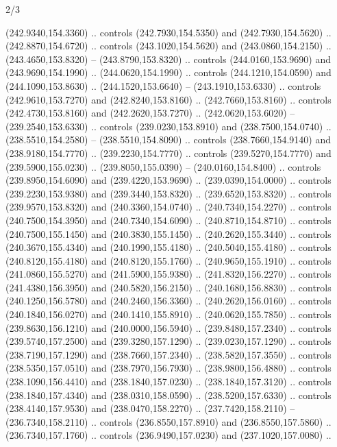 \begin{flagdescription}{2/3}
\begin{scope}[xshift=0.5\flaglength,yshift=0.5\flagwidth,scale=\flagwidth/259.2]
\begin{scope}[y=0.8pt, x=0.8pt, yscale=-1,shift={(-243,-162)}]
      (242.9340,154.3360) .. controls (242.7930,154.5350) and (242.7930,154.5620) ..
      (242.8870,154.6720) .. controls (243.1020,154.5620) and (243.0860,154.2150) ..
      (243.4650,153.8320) -- (243.8790,153.8320) .. controls (244.0160,153.9690) and
      (243.9690,154.1990) .. (244.0620,154.1990) .. controls (244.1210,154.0590) and
      (244.1090,153.8630) .. (244.1520,153.6640) -- (243.1910,153.6330) .. controls
      (242.9610,153.7270) and (242.8240,153.8160) .. (242.7660,153.8160) .. controls
      (242.4730,153.8160) and (242.2620,153.7270) .. (242.0620,153.6020) --
      (239.2540,153.6330) .. controls (239.0230,153.8910) and (238.7500,154.0740) ..
      (238.5510,154.2580) -- (238.5510,154.8090) .. controls (238.7660,154.9140) and
      (238.9180,154.7770) .. (239.2230,154.7770) .. controls (239.5270,154.7770) and
      (239.5900,155.0230) .. (239.8050,155.0390) -- (240.0160,154.8400) .. controls
      (239.8950,154.6090) and (239.4220,153.9690) .. (239.0390,154.0000) .. controls
      (239.2230,153.9380) and (239.3440,153.8320) .. (239.6520,153.8320) .. controls
      (239.9570,153.8320) and (240.3360,154.0740) .. (240.7340,154.2270) .. controls
      (240.7500,154.3950) and (240.7340,154.6090) .. (240.8710,154.8710) .. controls
      (240.7500,155.1450) and (240.3830,155.1450) .. (240.2620,155.3440) .. controls
      (240.3670,155.4340) and (240.1990,155.4180) .. (240.5040,155.4180) .. controls
      (240.8120,155.4180) and (240.8120,155.1760) .. (240.9650,155.1910) .. controls
      (241.0860,155.5270) and (241.5900,155.9380) .. (241.8320,156.2270) .. controls
      (241.4380,156.3950) and (240.5820,156.2150) .. (240.1680,156.8830) .. controls
      (240.1250,156.5780) and (240.2460,156.3360) .. (240.2620,156.0160) .. controls
      (240.1840,156.0270) and (240.1410,155.8910) .. (240.0620,155.7850) .. controls
      (239.8630,156.1210) and (240.0000,156.5940) .. (239.8480,157.2340) .. controls
      (239.5740,157.2500) and (239.3280,157.1290) .. (239.0230,157.1290) .. controls
      (238.7190,157.1290) and (238.7660,157.2340) .. (238.5820,157.3550) .. controls
      (238.5350,157.0510) and (238.7970,156.7930) .. (238.9800,156.4880) .. controls
      (238.1090,156.4410) and (238.1840,157.0230) .. (238.1840,157.3120) .. controls
      (238.1840,157.4340) and (238.0310,158.0590) .. (238.5200,157.6330) .. controls
      (238.4140,157.9530) and (238.0470,158.2270) .. (237.7420,158.2110) --
      (236.7340,158.2110) .. controls (236.8550,157.8910) and (236.8550,157.5860) ..
      (236.7340,157.1760) .. controls (236.9490,157.0230) and (237.1020,157.0080) ..

\end{scope}
\end{scope}
\end{flagdescription}

